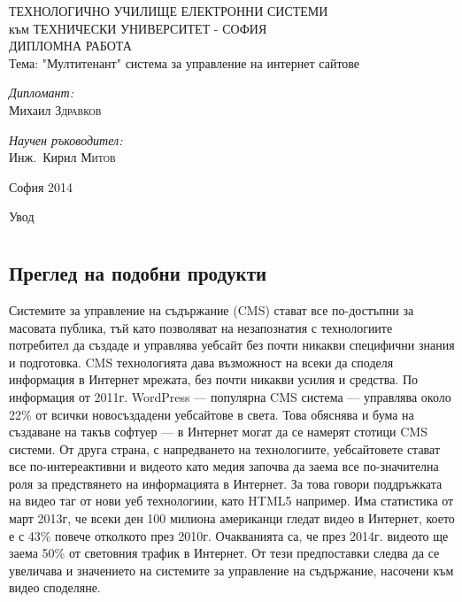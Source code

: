 \documentclass[pdftex,12pt,a4paper]{report}
\begin{document}
\setcounter{secnumdepth}{3}
\setcounter{tocdepth}{3}
\begin{titlepage}
	\begin{center}
		{\Huge ТЕХНОЛОГИЧНО УЧИЛИЩЕ ЕЛЕКТРОННИ СИСТЕМИ\\[0.5cm]} {\Large към ТЕХНИЧЕСКИ УНИВЕРСИТЕТ - СОФИЯ\\[3cm]}
		{\Huge ДИПЛОМНА РАБОТА\\[3cm]}
		Тема: "Мултитенант" система за управление на интернет сайтове\\[3cm]
		\begin{minipage}{0.4\textwidth}
			\begin{flushleft} \large
				\emph{Дипломант:}\\
				Михаил \textsc{Здравков}
			\end{flushleft}
		\end{minipage}
		\begin{minipage}{0.4\textwidth}
			\begin{flushright} \large
				\emph{Научен ръководител:} \\
				Инж.~Кирил \textsc{Митов}
			\end{flushright}
		\end{minipage}

		\vfill

		{\large София 2014}

	\end{center}
\end{titlepage}
\tableofcontents
\pagebreak
{}
{\Large\center Увод\\[1cm]}
\chapter[Първа глава]{}
\section[Преглед на подобни продукти] {Преглед на подобни продукти}
Системите за управление на съдържание (CMS) стават все по-достъпни за масовата публика, тъй като позволяват на незапознатия с технологиите потребител да създаде и управлява уебсайт без почти никакви специфични знания и подготовка. CMS технологията дава възможност на всеки да споделя информация в Интернет мрежата, без почти никакви усилия и средства. По информация от 2011г. WordPress — популярна CMS система — управлява около 22\% от всички новосъздадени уебсайтове в света. Това обяснява и бума на създаване на такъв софтуер — в Интернет могат да се намерят стотици CMS системи. От друга страна, с напредването на технологиите, уебсайтовете стават все по-интереактивни и видеото като медия започва да заема все по-значителна роля за предствянето на информацията в Интернет. За това говори поддръжката на видео таг от нови уеб технологиии, като HTML5 например. Има статистика от март 2013г, че всеки ден 100 милиона американци гледат видео в Интернет, което е с 43\% повече отколкото през 2010г. Очакванията са, че през 2014г. видеото ще заема 50\% от световния трафик в Интернет. От тези предпоставки следва да се увеличава и значението на системите за управление на съдържание, насочени към видео споделяне.
\end{document}
